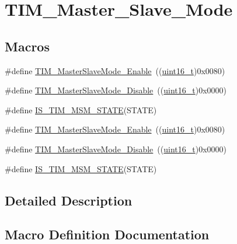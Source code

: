 \hypertarget{group___t_i_m___master___slave___mode}{}\section{T\+I\+M\+\_\+\+Master\+\_\+\+Slave\+\_\+\+Mode}
\label{group___t_i_m___master___slave___mode}
\subsection*{Macros}
\begin{DoxyCompactItemize}
\item 
\#define \hyperlink{group___t_i_m___master___slave___mode_gaef5da910ae6952fce424b440ea39f69a}{T\+I\+M\+\_\+\+Master\+Slave\+Mode\+\_\+\+Enable}~((\hyperlink{_p_e___types_8h_a1f1825b69244eb3ad2c7165ddc99c956}{uint16\+\_\+t})0x0080)
\item 
\#define \hyperlink{group___t_i_m___master___slave___mode_ga8d4c7c0f57469f384b1327bb323d28a3}{T\+I\+M\+\_\+\+Master\+Slave\+Mode\+\_\+\+Disable}~((\hyperlink{_p_e___types_8h_a1f1825b69244eb3ad2c7165ddc99c956}{uint16\+\_\+t})0x0000)
\item 
\#define \hyperlink{group___t_i_m___master___slave___mode_ga53146701cf287a0eca43b9232dffac60}{I\+S\+\_\+\+T\+I\+M\+\_\+\+M\+S\+M\+\_\+\+S\+T\+A\+TE}(S\+T\+A\+TE)
\item 
\#define \hyperlink{group___t_i_m___master___slave___mode_gaef5da910ae6952fce424b440ea39f69a}{T\+I\+M\+\_\+\+Master\+Slave\+Mode\+\_\+\+Enable}~((\hyperlink{_p_e___types_8h_a1f1825b69244eb3ad2c7165ddc99c956}{uint16\+\_\+t})0x0080)
\item 
\#define \hyperlink{group___t_i_m___master___slave___mode_ga8d4c7c0f57469f384b1327bb323d28a3}{T\+I\+M\+\_\+\+Master\+Slave\+Mode\+\_\+\+Disable}~((\hyperlink{_p_e___types_8h_a1f1825b69244eb3ad2c7165ddc99c956}{uint16\+\_\+t})0x0000)
\item 
\#define \hyperlink{group___t_i_m___master___slave___mode_ga53146701cf287a0eca43b9232dffac60}{I\+S\+\_\+\+T\+I\+M\+\_\+\+M\+S\+M\+\_\+\+S\+T\+A\+TE}(S\+T\+A\+TE)
\end{DoxyCompactItemize}


\subsection{Detailed Description}


\subsection{Macro Definition Documentation}
